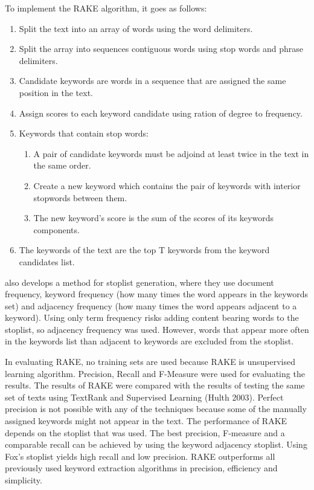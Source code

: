 \documentclass[11pt,a4paper]{article}
\begin{document}
To implement the RAKE algorithm, it goes as follows:

\begin{enumerate}
\item Split the text into an array of words using the word delimiters.
\item Split the array into sequences contiguous words using stop words and phrase delimiters.
\item Candidate keywords are words in a sequence that are assigned the same position in the text. 
\item Assign scores to each keyword candidate using ration of degree to frequency. 
\item Keywords that contain stop words:
\begin{enumerate}
\item A pair of candidate keywords must be adjoind at least twice in the text in the same order.
\item Create a new keyword which contains the pair of keywords with interior stopwords between them.
\item The new keyword’s score is the sum of the scores of its keywords components.
\end{enumerate}
\item The keywords of the text are the top T keywords from the keyword candidates list.
\end{enumerate}

\citet{1} also develops a method for stoplist generation, where they use document frequency, keyword frequency (how many times the word appears in the keywords set) and adjacency frequency (how many times the word appears adjacent to a keyword). Using only term frequency risks adding content bearing words to the stoplist, so adjacency frequency was used. However, words that appear more often in the keywords list than adjacent to keywords are excluded from the stoplist.   

In evaluating RAKE, no training sets are used because RAKE is unsupervised learning algorithm. Precision, Recall and F-Measure were used for evaluating the results. The results of RAKE were compared with the results of testing the same set of texts using TextRank and Supervised Learning (Hulth 2003). Perfect precision is not possible with any of the techniques because some of the manually assigned keywords might not appear in the text. The performance of RAKE depends on the stoplist that was used. The best precision, F-measure and a comparable recall can be achieved by using the keyword adjacency stoplist. Using Fox’s stoplist yields high recall and low precision. RAKE outperforms all previously used keyword extraction algorithms in precision, efficiency and simplicity.
\end{document}
